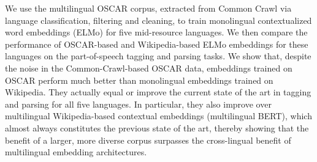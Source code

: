 We use the multilingual OSCAR corpus, extracted from Common Crawl via language classification, filtering and cleaning, to train monolingual contextualized word embeddings (ELMo) for five mid-resource languages. We then compare the performance of OSCAR-based and Wikipedia-based ELMo embeddings for these languages on the part-of-speech tagging and parsing tasks. We show that, despite the noise in the Common-Crawl-based OSCAR data, embeddings trained on OSCAR perform much better than monolingual embeddings trained on Wikipedia. They actually equal or improve the current state of the art in tagging and parsing for all five languages. In particular, they also improve over multilingual Wikipedia-based contextual embeddings (multilingual BERT), which almost always constitutes the previous state of the art, thereby showing that the benefit of a larger, more diverse corpus surpasses the cross-lingual benefit of multilingual embedding architectures.
